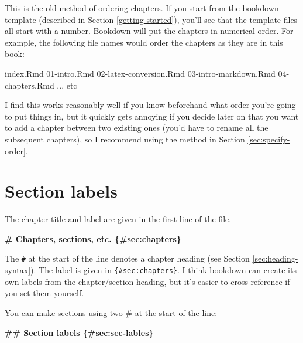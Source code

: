 \documentclass[
]{book}
\newenvironment{Shaded}{\begin{snugshade}}{\end{snugshade}}
\newcommand{\FunctionTok}[1]{\textcolor[rgb]{0.13,0.29,0.53}{\textbf{#1}}}
\newcommand{\NormalTok}[1]{#1}
\begin{document}
This is the old method of ordering chapters. If you start from the bookdown template (described in Section \ref{getting-started}), you'll see that the template files all start with a number. Bookdown will put the chapters in numerical order. For example, the following file names would order the chapters as they are in this book:

\begin{Shaded}
\begin{Highlighting}[]
\NormalTok{index.Rmd}
\NormalTok{01{-}intro.Rmd}
\NormalTok{02{-}latex{-}conversion.Rmd}
\NormalTok{03{-}intro{-}markdown.Rmd}
\NormalTok{04{-}chapters.Rmd}
\NormalTok{... etc}
\end{Highlighting}
\end{Shaded}

I find this works reasonably well if you know beforehand what order you're going to put things in, but it quickly gets annoying if you decide later on that you want to add a chapter between two existing ones (you'd have to rename all the subsequent chapters), so I recommend using the method in Section \ref{sec:specify-order}.

\section{Section labels}\label{sec:sec-labels}

The chapter title and label are given in the first line of the file.

\begin{Shaded}
\begin{Highlighting}[]
\FunctionTok{\# Chapters, sections, etc. \{\#sec:chapters\}}
\end{Highlighting}
\end{Shaded}

The \texttt{\#} at the start of the line denotes a chapter heading (see Section \ref{sec:heading-syntax}). The label is given in \texttt{\{\#sec:chapters\}}. I think bookdown can create its own labels from the chapter/section heading, but it's easier to cross-reference if you set them yourself.

You can make sections using two \# at the start of the line:

\begin{Shaded}
\begin{Highlighting}[]
\FunctionTok{\#\# Section labels \{\#sec:sec{-}lables\}}
\end{Highlighting}
\end{Shaded}
\end{document}
